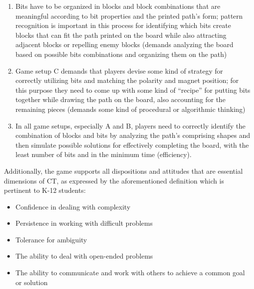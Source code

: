 \documentclass{acm_proc_article-sp}
\begin{document}
\begin{enumerate}
\item{Bits have to be organized in blocks and block combinations that are meaningful according to bit properties and the printed path's form; pattern recognition is important in this process for identifying which bits create blocks that can fit the path printed on the board while also attracting adjacent blocks or repelling enemy blocks (demands analyzing the board based on possible bits combinations and organizing them on the path)}
\item{Game setup C demands that players devise some kind of strategy for correctly utilizing bits and matching the polarity and magnet position; for this purpose they need to come up with some kind of ``recipe'' for putting bits together while drawing the path on the board, also accounting for the remaining pieces (demands some kind of procedural or algorithmic thinking)}
\item{In all game setups, especially A and B, players need to correctly identify the combination of blocks and bits by analyzing the path's comprising shapes and then simulate possible solutions for effectively completing the board, with the least number of bits and in the minimum time (efficiency).}
\end{enumerate}

Additionally, the game supports all dispositions and attitudes that are essential dimensions of CT, as expressed by the aforementioned definition which is pertinent to K-12 students:
\begin{itemize}
       \item Confidence in dealing with complexity
       \item Persistence in working with difficult problems
       \item Tolerance for ambiguity
       \item The ability to deal with open-ended problems
       \item The ability to communicate and work with others to achieve a common goal or solution
\end{itemize}

\end{document}
